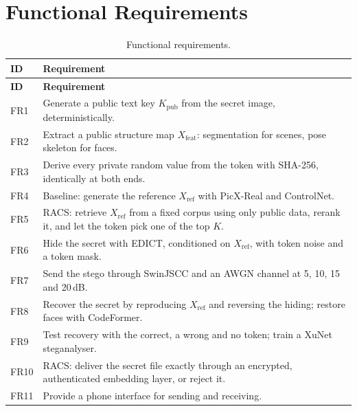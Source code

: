 \section{Functional Requirements}
\begin{longtable}{|>{\centering\arraybackslash}p{1.0cm}|p{10.6cm}|}
	\caption{Functional requirements.}\label{tab:fr}\\
	\hline
	\textbf{ID} & \textbf{Requirement} \\ \hline
	\endfirsthead
	\hline
	\textbf{ID} & \textbf{Requirement} \\ \hline
	\endhead
	FR1 & Generate a public text key $K_{\mathrm{pub}}$ from the secret image, deterministically. \\ \hline
	FR2 & Extract a public structure map $X_{\mathrm{feat}}$: segmentation for scenes, pose skeleton for faces. \\ \hline
	FR3 & Derive every private random value from the token with SHA-256, identically at both ends. \\ \hline
	FR4 & Baseline: generate the reference $X_{\mathrm{ref}}$ with PicX-Real and ControlNet. \\ \hline
	FR5 & RACS: retrieve $X_{\mathrm{ref}}$ from a fixed corpus using only public data, rerank it, and let the token pick one of the top $K$. \\ \hline
	FR6 & Hide the secret with EDICT, conditioned on $X_{\mathrm{ref}}$, with token noise and a token mask. \\ \hline
	FR7 & Send the stego through SwinJSCC and an AWGN channel at 5, 10, 15 and 20\,dB. \\ \hline
	FR8 & Recover the secret by reproducing $X_{\mathrm{ref}}$ and reversing the hiding; restore faces with CodeFormer. \\ \hline
	FR9 & Test recovery with the correct, a wrong and no token; train a XuNet steganalyser. \\ \hline
	FR10 & RACS: deliver the secret file exactly through an encrypted, authenticated embedding layer, or reject it. \\ \hline
	FR11 & Provide a phone interface for sending and receiving. \\ \hline
\end{longtable}

